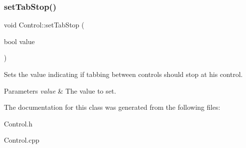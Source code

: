 \subsubsection{\texorpdfstring{setTabStop()}{setTabStop()}}
{\footnotesize\ttfamily void Control\+::set\+Tab\+Stop (\begin{DoxyParamCaption}\item[{bool}]{value }\end{DoxyParamCaption})}



Sets the value indicating if tabbing between controls should stop at his control. 


\begin{DoxyParams}{Parameters}
{\em value} & The value to set.\\
\hline
\end{DoxyParams}


The documentation for this class was generated from the following files\+:\begin{DoxyCompactItemize}
\item 
Control.\+h\item 
Control.\+cpp\end{DoxyCompactItemize}
